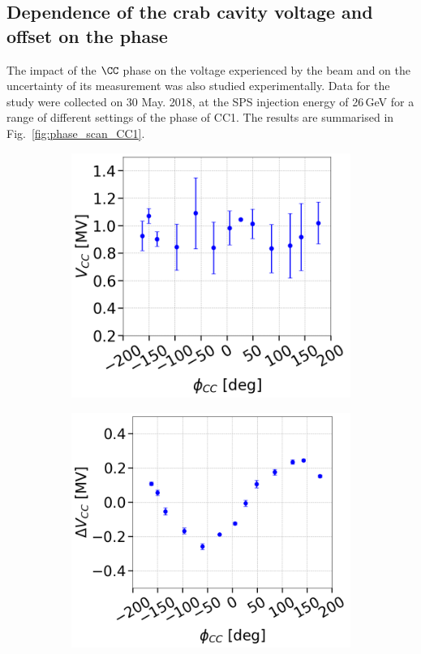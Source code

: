 \subsection{Dependence of the crab cavity voltage and offset on the phase}

The impact of the $\CC$ phase on the voltage experienced by the beam and on the uncertainty of its measurement was also studied experimentally. Data for the study were collected on 30 May. 2018, at the SPS injection energy of 26\,GeV for a range of different settings of the phase of CC1. The results are summarised in Fig.~\ref{fig:phase_scan_CC1}.

\begin{figure}[!ht]
   \centering
   \begin{subfigure}[t]{0.45\textwidth}
       \centering
       \includegraphics[width=1\textwidth]{images/Ch4/Vcc_vs_phase.png}
   \end{subfigure}
   \hfill
   \begin{subfigure}[t]{0.45\textwidth}
       \centering
       \includegraphics[width=1\textwidth]{images/Ch4/DeltaVcc_vs_phase.png}

\end{subfigure}
\end{figure}
